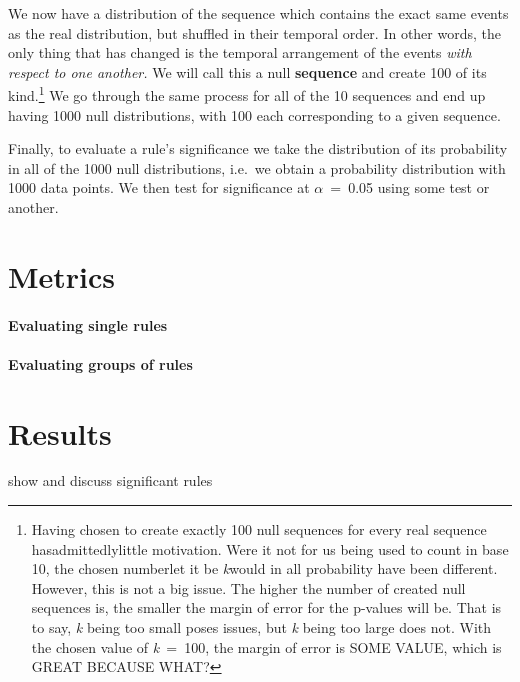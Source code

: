 We now have a distribution of the sequence which contains the exact same events as the real distribution, but shuffled in their temporal order.
In other words, the only thing that has changed is the temporal arrangement of the events \emph{with respect to one another.} We will call this a null \textbf{sequence} and create 100 of its kind.\footnote{Having chosen to create exactly 100 null sequences for every real sequence has\dash admittedly\dash little motivation.
Were it not for us being used to count in base 10, the chosen number\dash let it be \textit{k}\dash would in all probability have been different.
However, this is not a big issue.
The higher the number of created null sequences is, the smaller the margin of error for the p-values will be.
That is to say, \textit{k} being too small poses issues, but \textit{k} being too large does not.
With the chosen value of \textit{k}~=~100, the margin of error is SOME VALUE, which is GREAT BECAUSE WHAT?}
We go through the same process for all of the 10 sequences and end up having 1000 null distributions, with 100 each corresponding to a given sequence.

Finally, to evaluate a rule's significance we take the distribution of its probability in all of the 1000 null distributions, i.e.~we obtain a probability distribution with 1000 data points.
We then test for significance at \(\alpha\)~=~0.05 using some test or another.

%
%

\section{Metrics}
\paragraph{Evaluating single rules}
\paragraph{Evaluating groups of rules}
\section{Results}
\label{sec:significanceresults}
show and discuss significant rules




